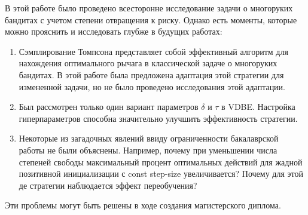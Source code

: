 В этой работе было проведено всесторонне исследование задачи о многоруких бандитах с учетом степени отвращения к риску. Однако есть моменты, которые можно прояснить и исследовать глубже в будущих работах:
\begin{enumerate}
    \item Сэмплирование Томпсона представляет собой эффективный алгоритм для нахождения оптимального рычага в классической задаче о многоруких бандитах. В этой работе была предложена адаптация этой стратегии для измененной задачи, но не было проведено исследования этой адаптации.
    \item Был рассмотрен только один вариант параметров $\delta$ и $\tau$ в VDBE. Настройка гиперпараметров способна значительно улучшить эффективность стратегии.
    \item Некоторые из загадочных явлений ввиду ограниченности бакалаврской работы не были объяснены. Например, почему при уменьшении числа степеней свободы максимальный процент оптимальных действий для жадной позитивной инициализации с const step-size увеличивается? Почему для этой де стратегии наблюдается эффект переобучения?
\end{enumerate}
Эти проблемы могут быть решены в ходе создания магистерского диплома.